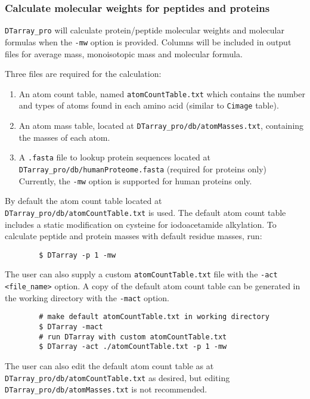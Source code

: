 \documentclass[12pt]{article}
\begin{document}
	\subsubsection{Calculate molecular weights for peptides and proteins}
	
	\texttt{DTarray\_pro} will calculate protein/peptide molecular weights and  molecular  formulas when the \texttt{-mw} option is provided. Columns  will  be  included in output files for average mass, monoisotopic mass and molecular formula.  
	
	\bigskip
	\noindent
	Three files are required for the calculation:
	
	\begin{enumerate}
		\item  An atom count table, named \texttt{atomCountTable.txt} which contains the number and types of atoms found in each amino acid (similar to \texttt{Cimage} table).
		
		\item An atom mass table, located at \texttt{DTarray\_pro/db/atomMasses.txt}, containing the masses of each atom.  
		
		\item A \texttt{.fasta} file to lookup protein sequences located at \\ \texttt{DTarray\_pro/db/humanProteome.fasta} (required for proteins only) Currently, the \texttt{-mw} option is supported for human proteins only.
	\end{enumerate}
	
	\noindent
	By default the atom count table located at \texttt{DTarray\_pro/db/atomCountTable.txt} is used. The default atom count table includes a static modification on cysteine for iodoacetamide alkylation.  To calculate peptide and protein masses with default residue masses, run:
	
	\begin{lstlisting}
		$ DTarray -p 1 -mw
	\end{lstlisting}
	
	\noindent
	The  user  can  also supply a custom \texttt{atomCountTable.txt} file with the \texttt{-act <file\_name>} option. A copy of the default atom count table can be generated in the working directory with the \texttt{-mact} option.  
	
	\begin{lstlisting}
		# make default atomCountTable.txt in working directory
		$ DTarray -mact
		# run DTarray with custom atomCountTable.txt
		$ DTarray -act ./atomCountTable.txt -p 1 -mw
	\end{lstlisting}
	
	\noindent
	The user can also edit the default atom count table as at \\ \texttt{DTarray\_pro/db/atomCountTable.txt} as desired, but editing \\ \texttt{DTarray\_pro/db/atomMasses.txt} is not recommended.
	
\end{document}
